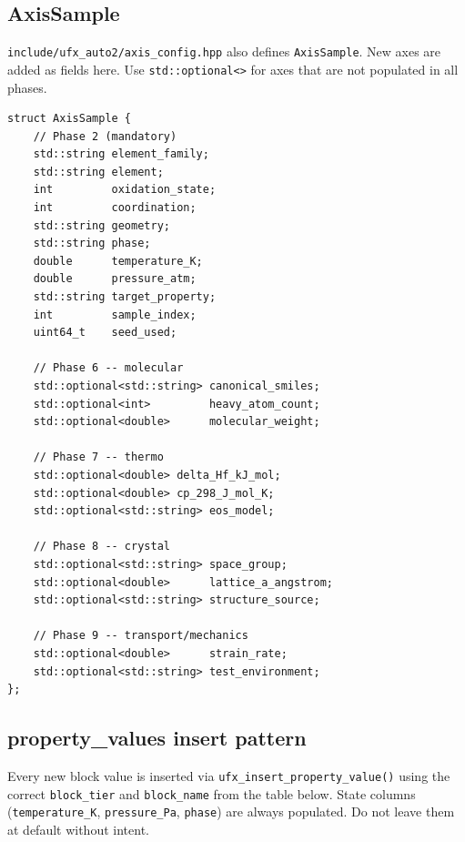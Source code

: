 \documentclass[11pt, a4paper]{article}
\begin{document}
\subsection{AxisSample}

\texttt{include/ufx\_auto2/axis\_config.hpp} also defines \texttt{AxisSample}.
New axes are added as fields here.  Use \texttt{std::optional<>} for axes that
are not populated in all phases.

\begin{lstlisting}
struct AxisSample {
	// Phase 2 (mandatory)
	std::string element_family;
	std::string element;
	int         oxidation_state;
	int         coordination;
	std::string geometry;
	std::string phase;
	double      temperature_K;
	double      pressure_atm;
	std::string target_property;
	int         sample_index;
	uint64_t    seed_used;

	// Phase 6 -- molecular
	std::optional<std::string> canonical_smiles;
	std::optional<int>         heavy_atom_count;
	std::optional<double>      molecular_weight;

	// Phase 7 -- thermo
	std::optional<double> delta_Hf_kJ_mol;
	std::optional<double> cp_298_J_mol_K;
	std::optional<std::string> eos_model;

	// Phase 8 -- crystal
	std::optional<std::string> space_group;
	std::optional<double>      lattice_a_angstrom;
	std::optional<std::string> structure_source;

	// Phase 9 -- transport/mechanics
	std::optional<double>      strain_rate;
	std::optional<std::string> test_environment;
};
\end{lstlisting}

\subsection{property\_values insert pattern}

Every new block value is inserted via \texttt{ufx\_insert\_property\_value()} using
the correct \texttt{block\_tier} and \texttt{block\_name} from the table below.
State columns (\texttt{temperature\_K}, \texttt{pressure\_Pa}, \texttt{phase})
are always populated.  Do not leave them at default without intent.
\end{document}
